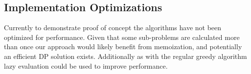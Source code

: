\subsection{Implementation Optimizations}

Currently to demonstrate proof of concept the algorithms have not been optimized for performance. Given that some sub-problems are calculated more than once our approach would likely benefit from memoization, and potentially an efficient DP solution exists. Additionally as with the regular greedy algorithm lazy evaluation could be used to improve performance. 

  